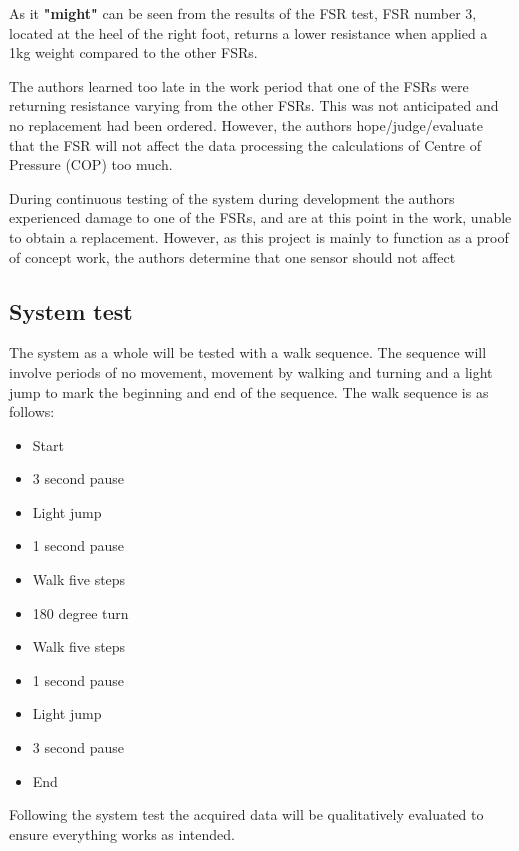 As it \textbf{"might"} can be seen from the results of the FSR test, FSR number 3, located at the heel of the right foot, returns a lower resistance when applied a 1kg weight compared to the other FSRs. 

The authors learned too late in the work period that one of the FSRs were returning resistance varying from the other FSRs. This was not anticipated and no replacement had been ordered. However, the authors hope/judge/evaluate that the FSR will not affect the data processing the calculations of Centre of Pressure (COP) too much.

During continuous testing of the system during development the authors experienced damage to one of the FSRs, and are at this point in the work, unable to obtain a replacement. However, as this project is mainly to function as a proof of concept work, the authors determine that one sensor should not affect 



\subsection{System test}
The system as a whole will be tested with a walk sequence. The sequence will involve periods of no movement, movement by walking and turning and a light jump to mark the beginning and end of the sequence. The walk sequence is as follows:

\begin{itemize}
	\item Start
	\item 3 second pause
	\item Light jump
	\item 1 second pause
	\item Walk five steps
	\item 180 degree turn
	\item Walk five steps
	\item 1 second pause
	\item Light jump
	\item 3 second pause
	\item End
\end{itemize}
Following the system test the acquired data will be qualitatively evaluated to ensure everything works as intended. 

